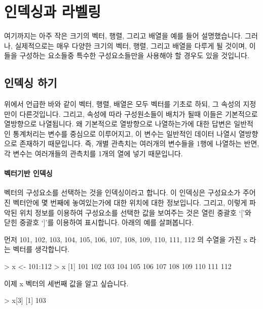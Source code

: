 \section{인덱싱과 라벨링}

여기까지는 아주 작은 크기의 벡터, 행렬, 그리고 배열을 예를 들어 설명했습니다.
그러나, 실제적으로는 매우 다양한 크기의 벡터, 행렬, 그리고 배열을 다루게 될 것이며, 이들을 구성하는 요소들중 특수한 구성요소들만을 사용해야 할 경우도 있을 것입니다.  

\subsection{인덱싱 하기}

위에서 언급한 바와 같이 벡터, 행렬, 배열은 모두 벡터를 기초로 하되, 그 속성의 지정만이 다른것입니다.
그리고, 속성에 따라 구성원소들이 배치가 될때 이들은 기본적으로 열방향으로 나열됩니다. 
왜 기본적으로 열방향으로 나열하는가에 대한 답변은 일반적인 통계처리는 변수를 중심으로 이루어지고, 이 변수는 일반적인 데이터 나열시 열방향으로 존재하기 때문입니다. 
즉, 개별 관측치는 여러개의 변수들을 1행에 나열하는 반면, 각 변수는 여러개들의 관측치를 1개의 열에 넣기 때문입니다.

\paragraph{벡터기반 인덱싱} 벡터의 구성요소를 선택하는 것을 인덱싱이라고 합니다. 
이 인덱싱은 구성요소가 주어진 벡터안에 몇 번째에 놓여있는가에 대한 위치에 대한 정보입니다.
그리고, 이렇게 파악된 위치 정보를 이용하여 구성요소를 선택한 값을 보여주는 것은 열린 중괄호 `['와 닫힌 중괄호 `]'를 이용하여 표시합니다. 
아래의 예를 살펴봅니다. 

먼저 101, 102, 103, 104, 105, 106, 107, 108, 109, 110, 111, 112 의 수열을 가진 x 라는 벡터를 생각합니다. 
 
\begin{Schunk}
\begin{Soutput}
> x <- 101:112
> x
 [1] 101 102 103 104 105 106 107 108 109 110 111 112
\end{Soutput}
\end{Schunk}

이제 x 벡터의 세번째 값을 알고 싶습니다. 

\begin{Schunk}
\begin{Soutput}
> x[3]
[1] 103
\end{Soutput}
\end{Schunk}


